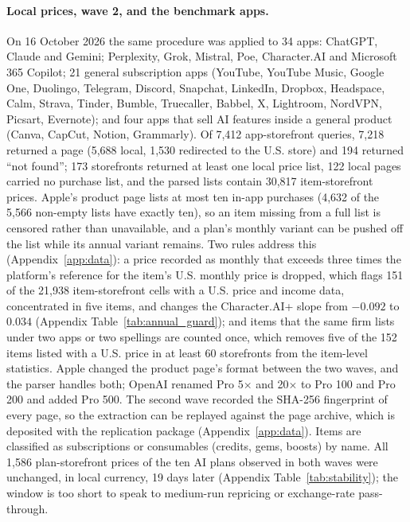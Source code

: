 \documentclass[11pt]{article}
\theoremstyle{definition}
\theoremstyle{remark}
\begin{document}
\paragraph{Local prices, wave 2, and the benchmark apps.} On 16 October 2026 the same procedure was applied to 34 apps: ChatGPT, Claude and Gemini; Perplexity, Grok, Mistral, Poe, Character.AI and Microsoft 365 Copilot; 21 general subscription apps (YouTube, YouTube Music, Google One, Duolingo, Telegram, Discord, Snapchat, LinkedIn, Dropbox, Headspace, Calm, Strava, Tinder, Bumble, Truecaller, Babbel, X, Lightroom, NordVPN, Picsart, Evernote); and four apps that sell AI features inside a general product (Canva, CapCut, Notion, Grammarly). Of 7,412 app-storefront queries, 7,218 returned a page (5,688 local, 1,530 redirected to the U.S. store) and 194 returned ``not found''; 173 storefronts returned at least one local price list, 122 local pages carried no purchase list, and the parsed lists contain 30,817 item-storefront prices. Apple's product page lists at most ten in-app purchases (4,632 of the 5,566 non-empty lists have exactly ten), so an item missing from a full list is censored rather than unavailable, and a plan's monthly variant can be pushed off the list while its annual variant remains. Two rules address this (Appendix~\ref{app:data}): a price recorded as monthly that exceeds three times the platform's reference for the item's U.S. monthly price is dropped, which flags 151 of the 21,938 item-storefront cells with a U.S. price and income data, concentrated in five items, and changes the Character.AI+ slope from $-0.092$ to $0.034$ (Appendix Table~\ref{tab:annual_guard}); and items that the same firm lists under two apps or two spellings are counted once, which removes five of the 152 items listed with a U.S. price in at least 60 storefronts from the item-level statistics. Apple changed the product page's format between the two waves, and the parser handles both; OpenAI renamed Pro 5$\times$ and 20$\times$ to Pro 100 and Pro 200 and added Pro 500. The second wave recorded the SHA-256 fingerprint of every page, so the extraction can be replayed against the page archive, which is deposited with the replication package (Appendix~\ref{app:data}). Items are classified as subscriptions or consumables (credits, gems, boosts) by name. All 1,586 plan-storefront prices of the ten AI plans observed in both waves were unchanged, in local currency, 19 days later (Appendix Table~\ref{tab:stability}); the window is too short to speak to medium-run repricing or exchange-rate pass-through.
\end{document}
